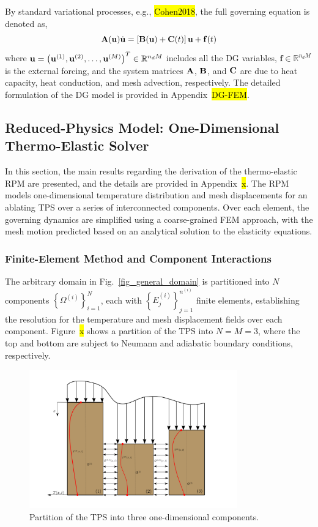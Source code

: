 By standard variational processes, e.g., \hl{Cohen2018}, the full governing equation is denoted as,
\begin{equation}
    \mathbf{A}(\mathbf{u})\dot{\mathbf{u}} = \left[\mathbf{B}(\mathbf{u}) + \mathbf{C}(t)\right]\mathbf{u} + \mathbf{f}(t)\label{eqn_energy_fem}
\end{equation}
where $\mathbf{u} = \left(\mathbf{u}^{(1)}, \mathbf{u}^{(2)}, \ldots, \mathbf{u}^{(M)}\right)^T\in\mathbb{R}^{n_dM}$ includes all the DG variables, $\mathbf{f}\in\mathbb{R}^{n_dM}$ is the external forcing, and the system matrices $\mathbf{A}$, $\mathbf{B}$, and $\mathbf{C}$ are due to heat capacity, heat conduction, and mesh advection, respectively. The detailed formulation of the DG model is provided in Appendix~\hl{DG-FEM}.

\subsection{Reduced-Physics Model: One-Dimensional Thermo-Elastic Solver}

In this section, the main results regarding the derivation of the thermo-elastic RPM are presented, and the details are provided in Appendix~\hl{x}. The RPM models one-dimensional temperature distribution and mesh displacements for an ablating TPS over a series of interconnected components. Over each element, the governing dynamics are simplified using a coarse-grained FEM approach, with the mesh motion predicted based on an analytical solution to the elasticity equations.

\subsubsection{Finite-Element Method and Component Interactions}

The arbitrary domain in Fig.~\ref{fig_general_domain} is partitioned into $N$ components $\left\{\Omega^{(i)}\right\}_{i=1}^{N}$, each with $\left\{E^{(i)}_j\right\}_{j=1}^{n^{(i)}}$ finite elements, establishing the resolution for the temperature and mesh displacement fields over each component. Figure~\hl{x} shows a partition of the TPS into $N=M=3$, where the top and bottom are subject to Neumann and adiabatic boundary conditions, respectively. 

\begin{figure}
    \centering
    \includegraphics[width=0.8\textwidth]{./figs/three_components.png}
    \caption{Partition of the TPS into three one-dimensional components.}
    \label{fig_domain_partition}
\end{figure}

